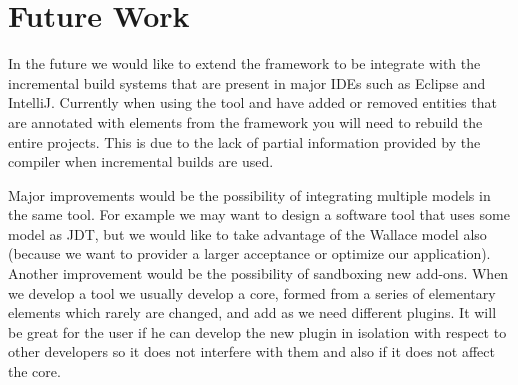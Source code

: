	
\section{Future Work}

	In the future we would like to extend the framework to be integrate with the
incremental build systems that are present in major IDEs such as Eclipse and
IntelliJ. Currently when using the tool and have added or removed entities that
are annotated with elements from the framework you will need to rebuild the
entire projects. This is due to the lack of partial information provided by the
compiler when incremental builds are used. 

	Major improvements would be the possibility of integrating multiple models in
the same tool. For example we may want to design a software tool that uses some
model as JDT, but we would like to take advantage of the Wallace model also
(because we want to provider a larger acceptance or optimize our application).\\
	Another improvement would be the possibility of sandboxing new add-ons. When
we develop a tool we usually develop a core, formed from a series of elementary
elements which rarely are changed, and add as we need different plugins. It
will be great for the user if he can develop the new plugin in isolation with respect 
to other developers so it does not interfere with them and also if it does not
affect the core.
